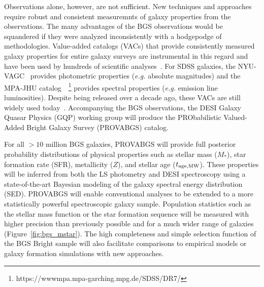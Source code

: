 Observations alone, however, are not sufficient.  
New techniques and approaches require robust and consistent measuremnts of
galaxy properties from the observations.
The many advantages of the BGS observations would be squandered if they were 
analyzed inconsistently with a hodgepodge of methodologies.  
Value-added catalogs (VACs) that provide consistently measured galaxy
properties for entire galaxy surveys are instrumental in this regard and have
been used by hundreds of scientific
analyses~\citep[see][for a review]{blanton2009}. 
For SDSS galaxies, the NYU-VAGC~\citep{blanton2005} provides photometric properties
(\emph{e.g.} absolute magnitudes) and the MPA-JHU
catalog~~\citep{brinchmann2004}\footnote{https://wwwmpa.mpa-garching.mpg.de/SDSS/DR7/}
provides spectral properties (\emph{e.g.} emission line
luminosities).
Despite being released over a decade ago, these VACs are still widely used
today~\citep[\emph{e.g.}][]{alpaslan2021, odonnell2021, trevisan2021}. 
Accompanying the BGS observations, the DESI Galaxy Quasar Physics (GQP) working
group will produce the PRObabilistic Valued-Added Bright Galaxy Survey
(PROVABGS) catalog. 

For all ${>}10$ million BGS galaxies, PROVABGS will provide full posterior
probability distributions of physical properties such as stellar mass ($M_*$),
star formation rate (SFR), metallicity ($Z$), and stellar age ($t_{\rm age, MW}$). 
These properties will be inferred from both the LS photometry and DESI
spectroscopy using a state-of-the-art Bayesian modeling of the galaxy spectral
energy distribution (SED). 
PROVABGS will enable conventional analyses to be extended to a more
statistically powerful spectroscopic galaxy sample. 
Population statistics such as the stellar mass function or the star formation
sequence will be measured with higher precision than previously possible and
for a much wider range of galaxies (Figure~\ref{fig:bgs_mstar}). 
The high completeness and simple selection function of the BGS Bright sample
will also facilitate  comparisons to empirical models or galaxy formation
simulations with new approaches. 

